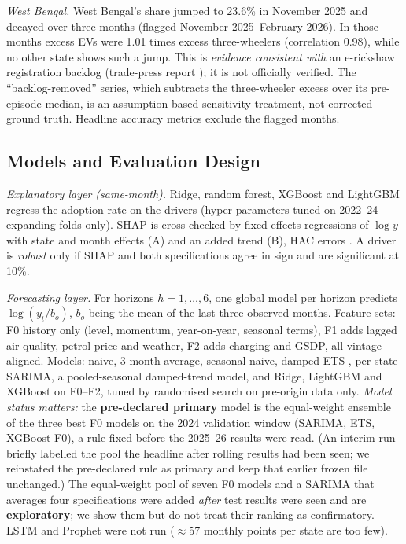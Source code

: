 \textit{West Bengal.} West Bengal's share jumped to 23.6\% in November 2025 and decayed over three months (flagged November 2025--February 2026). In those months excess EVs were 1.01 times excess three-wheelers (correlation 0.98), while no other state shows such a jump. This is \emph{evidence consistent with} an e-rickshaw registration backlog (trade-press report \cite{emobility}); it is not officially verified. The ``backlog-removed'' series, which subtracts the three-wheeler excess over its pre-episode median, is an assumption-based sensitivity treatment, not corrected ground truth. Headline accuracy metrics exclude the flagged months.

\subsection{Models and Evaluation Design}
\textit{Explanatory layer (same-month).} Ridge, random forest, XGBoost and LightGBM regress the adoption rate on the drivers (hyper-parameters tuned on 2022--24 expanding folds only). SHAP \cite{lundberg} is cross-checked by fixed-effects regressions of $\log y$ with state and month effects (A) and an added trend (B), HAC errors \cite{neweywest}. A driver is \emph{robust} only if SHAP and both specifications agree in sign and are significant at 10\%.

\textit{Forecasting layer.} For horizons $h=1,\dots,6$, one global model per horizon predicts $\log(y_{t}/b_o)$, $b_o$ being the mean of the last three observed months. Feature sets: F0 history only (level, momentum, year-on-year, seasonal terms), F1 adds lagged air quality, petrol price and weather, F2 adds charging and GSDP, all vintage-aligned. Models: naive, 3-month average, seasonal naive, damped ETS \cite{hyndman}, per-state SARIMA, a pooled-seasonal damped-trend model, and Ridge, LightGBM and XGBoost on F0--F2, tuned by randomised search on pre-origin data only. \emph{Model status matters:} the \textbf{pre-declared primary} model is the equal-weight ensemble of the three best F0 models on the 2024 validation window (SARIMA, ETS, XGBoost-F0), a rule fixed before the 2025--26 results were read. (An interim run briefly labelled the pool the headline after rolling results had been seen; we reinstated the pre-declared rule as primary and keep that earlier frozen file unchanged.) The equal-weight pool of seven F0 models and a SARIMA that averages four specifications were added \emph{after} test results were seen and are \textbf{exploratory}; we show them but do not treat their ranking as confirmatory. LSTM and Prophet were not run ($\approx$57 monthly points per state are too few).

